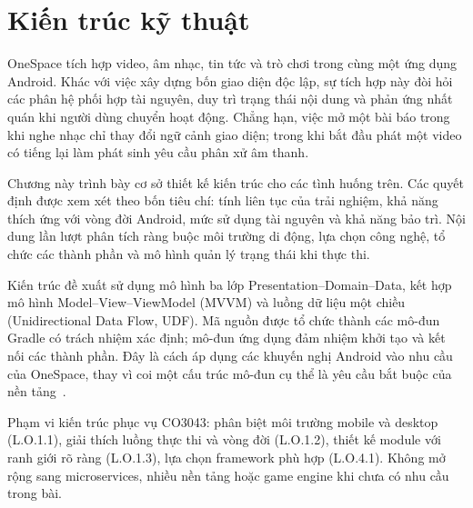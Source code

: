 \section{Kiến trúc kỹ thuật}
\label{sec:technical-architecture}
\begingroup
\setlength{\emergencystretch}{3em}
\captionsetup[table]{name=Bảng}

OneSpace tích hợp video, âm nhạc, tin tức và trò chơi trong cùng một ứng dụng Android. Khác với việc xây dựng bốn giao diện độc lập, sự tích hợp này đòi hỏi các phân hệ phối hợp tài nguyên, duy trì trạng thái nội dung và phản ứng nhất quán khi người dùng chuyển hoạt động. Chẳng hạn, việc mở một bài báo trong khi nghe nhạc chỉ thay đổi ngữ cảnh giao diện; trong khi bắt đầu phát một video có tiếng lại làm phát sinh yêu cầu phân xử âm thanh.

Chương này trình bày cơ sở thiết kế kiến trúc cho các tình huống trên. Các quyết định được xem xét theo bốn tiêu chí: tính liên tục của trải nghiệm, khả năng thích ứng với vòng đời Android, mức sử dụng tài nguyên và khả năng bảo trì. Nội dung lần lượt phân tích ràng buộc môi trường di động, lựa chọn công nghệ, tổ chức các thành phần và mô hình quản lý trạng thái khi thực thi.

Kiến trúc đề xuất sử dụng mô hình ba lớp Presentation--Domain--Data, kết hợp mô hình Model--View--ViewModel (MVVM) và luồng dữ liệu một chiều (Unidirectional Data Flow, UDF). Mã nguồn được tổ chức thành các mô-đun Gradle có trách nhiệm xác định; mô-đun ứng dụng đảm nhiệm khởi tạo và kết nối các thành phần. Đây là cách áp dụng các khuyến nghị Android vào nhu cầu của OneSpace, thay vì coi một cấu trúc mô-đun cụ thể là yêu cầu bắt buộc của nền tảng~\cite{android-architecture,android-modularization}.

Phạm vi kiến trúc phục vụ CO3043: phân biệt môi trường mobile và desktop (L.O.1.1), giải thích luồng thực thi và vòng đời (L.O.1.2), thiết kế module với ranh giới rõ ràng (L.O.1.3), lựa chọn framework phù hợp (L.O.4.1). Không mở rộng sang microservices, nhiều nền tảng hoặc game engine khi chưa có nhu cầu trong bài.

